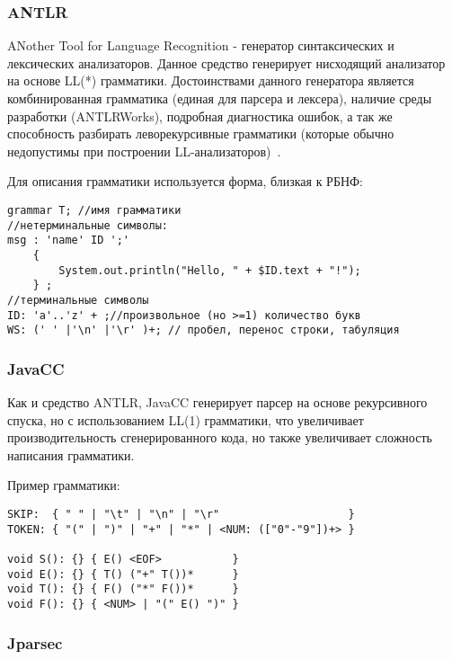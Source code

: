 \subsubsection{ANTLR}

ANother Tool for Language Recognition - генератор синтаксических и лексических
анализаторов. Данное средство генерирует нисходящий анализатор на основе LL(*)
грамматики. Достоинствами данного генератора является комбинированная грамматика
(единая для парсера и лексера), наличие среды разработки (ANTLRWorks), подробная
диагностика ошибок, а так же способность разбирать леворекурсивные грамматики
(которые обычно недопустимы при построении LL-анализаторов)~\cite{parr_definitive_2007}.

Для описания грамматики используется форма, близкая к РБНФ:

\begin{lstlisting}[caption={Пример грамматики, используемой в средстве ANTLR}]
 grammar T; //имя грамматики
//нетерминальные символы:
msg : 'name' ID ';'
    {
        System.out.println("Hello, " + $ID.text + "!");
    } ;
//терминальные символы
ID: 'a'..'z' + ;//произвольное (но >=1) количество букв
WS: (' ' |'\n' |'\r' )+; // пробел, перенос строки, табуляция
\end{lstlisting}

\subsubsection{JavaCC}

Как и средство ANTLR, JavaCC генерирует парсер на основе рекурсивного спуска, но
с использованием LL(1) грамматики, что увеличивает производительность
сгенерированного кода, но также увеличивает сложность написания грамматики.

Пример грамматики:

\begin{lstlisting}[caption={Пример грамматики, используемой в средстве JavaCC}]
SKIP:  { " " | "\t" | "\n" | "\r"                    }
TOKEN: { "(" | ")" | "+" | "*" | <NUM: (["0"-"9"])+> }

void S(): {} { E() <EOF>           }
void E(): {} { T() ("+" T())*      }
void T(): {} { F() ("*" F())*      }
void F(): {} { <NUM> | "(" E() ")" }
\end{lstlisting}

\subsubsection{Jparsec}


